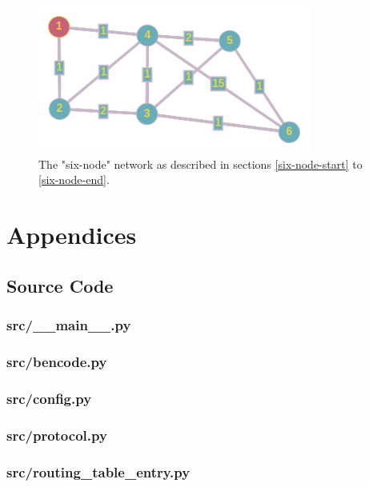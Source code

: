 \documentclass[11pt]{article} %
\begin{document}
\begin{figure}[H]
	\centering
	\label{fig:six-node}
	\includegraphics[width=0.8\textwidth]{includes/images/six-node}
	\caption{The "six-node" network as described in sections \ref{six-node-start} to \ref{six-node-end}.}
\end{figure}

\newpage
\section{Appendices}

\subsection{Source Code}

\subsubsection{src/\_\_main\_\_.py}


\subsubsection{src/bencode.py}


\subsubsection{src/config.py}


\subsubsection{src/protocol.py}


\subsubsection{src/routing\_table\_entry.py}

\end{document}
